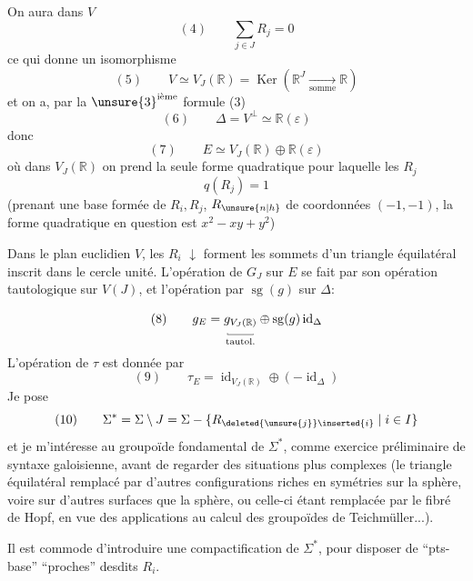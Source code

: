 On aura dans $V$
\[
(4)\qquad\sum_{j\in J}R_j=0
\]
ce qui donne un isomorphisme
\[
(5)\qquad V\simeq V_J(\mathbb R)=\operatorname{Ker}(\mathbb R^J\xrightarrow[\text{somme}]{}\mathbb R)
\]
et on a, par la ${\unsure{3}}^{\text{ième}}$ formule (3)
\[
(6)\qquad\Delta=V^\perp\simeq\mathbb R(\varepsilon)
\]
donc
\[
(7)\qquad E\simeq V_J(\mathbb R)\oplus\mathbb R(\varepsilon)
\]
où dans $V_J(\mathbb R)$ on prend la seule forme quadratique  pour laquelle les $R_j$   
\[
q(R_j)=1
\]
(prenant une base formée de $R_i,R_j$, $R_{\unsure{n|h}}$ de coordonnées $(-1,-1)$, la forme quadratique en question est $x^2-xy+y^2$)

Dans le plan euclidien $V$, les $R_i$
\(\downarrow\)
forment les sommets d'un triangle équilatéral inscrit dans le cercle unité.
L'opération de $G_J$ sur $E$ se fait par son opération  tautologique sur $V(J)$, et l'opération par $\operatorname{sg}(g)$ sur $\Delta$:

\[
(8)\qquad g_E=\underset{\text{tautol.}}{\underset{\rule{0.35pt}{0.32ex}\rule{2em}{0.35pt}\rule{0.35pt}{0.18ex}}{g_{V_J(\mathbb R)}}}\oplus\operatorname{sg}(g)\operatorname{id}_\Delta
\]
L'opération de $\tau$ est donnée par
\[
(9)\qquad\tau_E=\operatorname{id}_{V_J(\mathbb R)}\oplus(-\operatorname{id}_\Delta)
\]
Je pose
\[
(10)\qquad\Sigma^*=\Sigma\setminus J=\Sigma-\{R_{\deleted{\unsure{j}}\inserted{i}}\mid i\in I\}
\]
et je m'intéresse au groupoïde fondamental de $\Sigma^*$, comme exercice préliminaire de syntaxe galoisienne, avant de regarder des situations  plus complexes (le triangle équilatéral remplacé par d'autres configurations riches en symétries sur la sphère, voire sur d'autres surfaces que la sphère, ou celle-ci étant remplacée par le fibré de Hopf, en vue des applications au calcul des groupoïdes de Teichmüller...).

Il est commode d'introduire une compactification de $\Sigma^*$, pour disposer  de ``pts-base'' ``proches'' desdits $R_i$.

